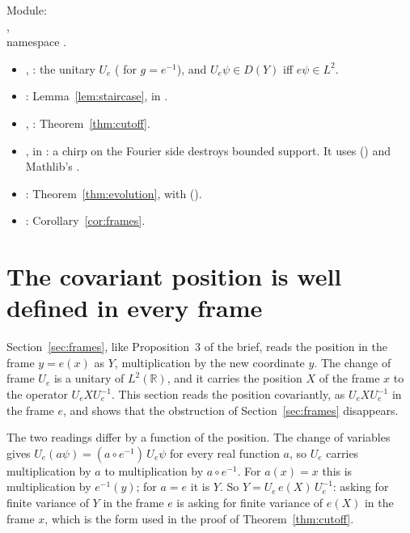 \documentclass[11pt]{article}
\theoremstyle{remark}
\begin{document}
Module:\\ ,\\ namespace
.
\begin{itemize}
  \item {}, : the unitary
    $U_e$ ( for $g = e^{-1}$), and $U_e\psi \in D(Y)$ iff $e\psi \in L^2$.
  \item {}: Lemma~\ref{lem:staircase}, in
    .
  \item {}, :
    Theorem~\ref{thm:cutoff}.
  \item {}, in
    : a chirp on the Fourier side destroys bounded
    support. It uses 
    () and Mathlib's
    .
  \item {}: Theorem~\ref{thm:evolution}, with
    ().
  \item {}: Corollary~\ref{cor:frames}.
\end{itemize}

\section{The covariant position is well defined in every frame}
\label{sec:covariant}

Section~\ref{sec:frames}, like Proposition~3 of the brief, reads the position in the frame
$y = e(x)$ as $Y$, multiplication by the new coordinate $y$. The change of frame $U_e$ is a
unitary of $L^2(\mathbb R)$, and it carries the position $X$ of the frame $x$ to the operator
$U_e X U_e^{-1}$. This section reads the position covariantly, as $U_e X U_e^{-1}$ in the frame
$e$, and shows that the obstruction of Section~\ref{sec:frames} disappears.

The two readings differ by a function of the position. The change of variables gives
$U_e(a\psi) = (a \circ e^{-1})\,U_e\psi$ for every real function $a$, so $U_e$ carries
multiplication by $a$ to multiplication by $a \circ e^{-1}$. For $a(x) = x$ this is
multiplication by $e^{-1}(y)$; for $a = e$ it is $Y$. So $Y = U_e\, e(X)\, U_e^{-1}$: asking for
finite variance of $Y$ in the frame $e$ is asking for finite variance of $e(X)$ in the frame
$x$, which is the form used in the proof of Theorem~\ref{thm:cutoff}.
\end{document}
